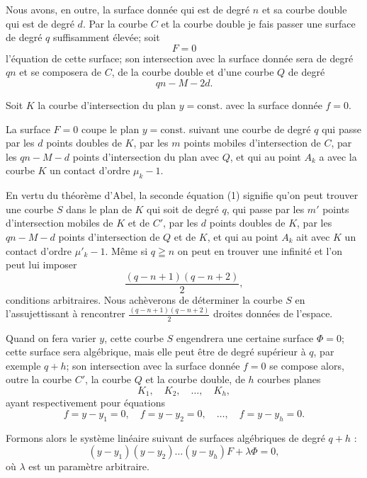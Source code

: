 \documentclass{article}
\begin{document}
Nous avons, en outre, la surface donnée qui est de degré $n$ et sa courbe double qui est de degré $d$. Par la courbe $C$ et la courbe double je fais passer une surface de degré $q$ suffisamment élevée; soit
\[
F = 0
\]
l'équation de cette surface; son intersection avec la surface donnée sera de degré $qn$ et se composera de $C$, de la courbe double et d'une courbe $Q$ de degré
\[
qn - M - 2d.
\]

Soit $K$ la courbe d'intersection du plan $y = \text{const.}$ avec la surface donnée $f = 0$.

La surface $F = 0$ coupe le plan $y = \text{const.}$ suivant une courbe de degré $q$ qui passe par les $d$ points doubles de $K$, par les $m$ points mobiles d'intersection de $C$, par les $qn - M - d$ points d'intersection du plan avec $Q$, et qui au point $A_{k}$ a avec la courbe $K$ un contact d'ordre $\mu_{k} - 1$.

En vertu du théorème d'Abel, la seconde équation (1) signifie qu'on peut trouver une courbe $S$ dans le plan de $K$ qui soit de degré $q$, qui passe par les $m'$ points d'intersection mobiles de $K$ et de $C'$, par les $d$ points doubles de $K$, par les $qn - M - d$ points d'intersection de $Q$ et de $K$, et qui au point $A_{k}$ ait avec $K$ un contact d'ordre $\mu'_{k} - 1$. Même si $q \geqq n$ on peut en trouver une infinité et l'on peut lui imposer
\[
\frac{(q - n + 1)(q - n + 2)}{2},
\]
conditions arbitraires. Nous achèverons de déterminer la courbe $S$ en l'assujettissant à rencontrer $\frac{(q - n + 1)(q - n + 2)}{2}$ droites données de l'espace.

Quand on fera varier $y$, cette courbe $S$ engendrera une certaine surface $\Phi = 0$; cette surface sera algébrique, mais elle peut être de
degré supérieur à $q$, par exemple $q + h$; son intersection avec la surface donnée $f = 0$ se compose alors, outre la courbe $C'$, la courbe $Q$ et la courbe double, de $h$ courbes planes
\[
K_{1}, \quad K_{2}, \quad \ldots, \quad K_{h},
\]
ayant respectivement pour équations
\[
f = y - y_{1} = 0, \quad f = y - y_{2} = 0, \quad \ldots, \quad f = y - y_{h} = 0.
\]

Formons alors le système linéaire suivant de surfaces algébriques de degré $q + h$ :
\[
(y - y_{1})(y - y_{2}) \ldots (y - y_{h}) F + \lambda\Phi = 0,
\]
où $\lambda$ est un paramètre arbitraire.
\end{document}
